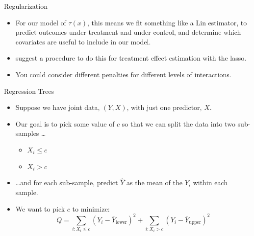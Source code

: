 \documentclass[xcolor={dvipsnames},handout]{beamer}
\begin{document}

\begin{frame}{Regularization}

\begin{itemize}
\item For our model of $\tau(x)$, this means we fit something like a Lin estimator, to predict outcomes under treatment and under control, and determine which covariates are useful to include in our model.
\item \cite{bloniarz2016lasso} suggest a procedure to do this for treatment effect estimation with the lasso.
\item You could consider different penalties for different levels of interactions.
\end{itemize}

\end{frame}




\begin{frame}{Regression Trees}

\begin{itemize}
\item Suppose we have joint data, $(Y,X)$, with just one predictor, $X$.
\item Our goal is to pick some value of $c$ so that we can split the data into two sub-samples \dots
\begin{itemize}
\item $X_i \le c$
\item $X_i >c$
\end{itemize}
\item\dots and for each sub-sample, predict $\hat Y $ as the mean of the $Y_i$ within each sample.
\item We want to pick $c$ to minimize:
$$
Q = \sum_{i:X_i \le c}(Y_i - \bar Y_{\text{lower}})^2 + \sum_{i:X_i > c}(Y_i - \bar Y_{\text{upper}})^2
$$
\end{itemize}


\end{frame}
\end{document}
